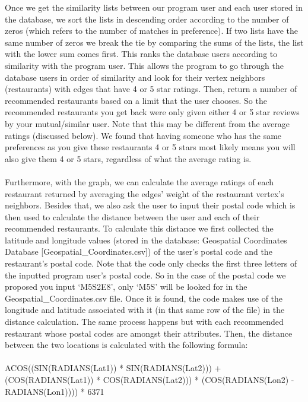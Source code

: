 \documentclass{article}
\begin{document}
Once we get the similarity lists between our program user and each user stored in the database, we sort the lists in descending order according to the number of zeros (which refers to the number of matches in preference). If two lists have the same number of zeros we break the tie by comparing the sums of the lists, the list with the lower sum comes first. This ranks the database users according to similarity with the program user. This allows the program to go through the database users in order of similarity and look for their vertex neighbors (restaurants) with edges that have 4 or 5 star ratings. Then, return a number of  recommended restaurants based on a limit that the user chooses. So the recommended restaurants you get back were only given either 4 or 5 star reviews by your mutual/similar user. Note that this may be different from the average ratings (discussed below). We found that having someone who has the same preferences as you give these restaurants 4 or 5 stars most likely means you will also give them 4 or 5 stars, regardless of what the average rating is.
\\\\

Furthermore, with the graph, we can calculate the average ratings of each restaurant returned by averaging the edges’ weight of the restaurant vertex’s neighbors.  Besides that, we also ask the user to input their postal code which is then used to calculate the distance between the user and each of their recommended restaurants. To calculate this distance we first collected the latitude and longitude values  (stored in the database: Geospatial Coordinates Database [Geospatial\_Coordinates.csv])  of the user’s postal code and the restaurant’s postal code. Note that the code only checks the first three letters of the inputted program user’s postal code. So in the case of the postal code we proposed you input ‘M5S2E8’, only ‘M5S’ will be looked for in the Geospatial\_Coordinates.csv file. Once it is found, the code makes use of the longitude and latitude associated with it (in that same row of the file) in the distance calculation. The same process happens but with each recommended restaurant whose postal codes are amongst their attributes. Then, the distance between the two locations is calculated with the following formula: 
\\\\

ACOS((SIN(RADIANS(Lat1)) * SIN(RADIANS(Lat2))) + (COS(RADIANS(Lat1)) * COS(RADIANS(Lat2))) * (COS(RADIANS(Lon2) - RADIANS(Lon1)))) * 6371
\\\\
\end{document}
